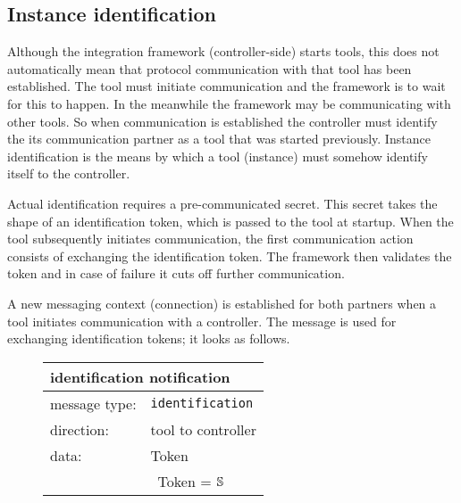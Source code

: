 \documentclass{article}
\newcommand{\msg}[1]{\texttt{#1}}
\newcommand{\String}{\ensuremath \mathbb{S}\xspace}
\begin{document}
  \subsection{Instance identification} \label{s:instance_identification}

   Although the integration framework (controller-side) starts tools, this
   does not automatically mean that protocol communication with that tool has
   been established. The tool must initiate communication and the framework is
   to wait for this to happen. In the meanwhile the framework may be
   communicating with other tools. So when communication is established the
   controller must identify the its communication partner as a tool that was
   started previously. Instance identification is the means by which a tool
   (instance) must somehow identify itself to the controller.
   
   Actual identification requires a pre-communicated secret. This secret takes
   the shape of an identification token, which is passed to the tool at
   startup.  When the tool subsequently initiates communication, the first
   communication action consists of exchanging the identification token. The
   framework then validates the token and in case of failure it cuts off
   further communication.

   A new messaging context (connection) is established for both partners when a
   tool initiates communication with a controller. The  message is used for exchanging identification tokens; it looks
   as follows.
   
   \begin{figure}[H]
    \begin{center}
     \begin{tabular}{|ll|}
      \hline
       \multicolumn{2}{|l|}{\textbf{identification notification}} \\
      \hline
       message type:    & \msg{identification} \\
      \hline
       direction:       & tool to controller \\
       data:            & Token \\
                        & \ Token = $\String$ \\
      \hline
     \end{tabular}
     \vspace{-0.5cm}
    \end{center}
   \end{figure}
\end{document}
